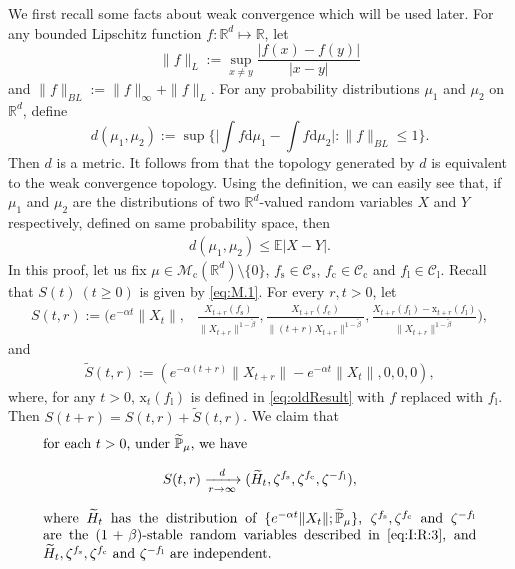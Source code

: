 \documentclass{amse-new}
\numberwithin{equation}{section}
\begin{document}
\begin{prof}
 	We first recall some facts about weak convergence which will be used later.
	For any bounded Lipschitz function $f:\mathbb R^d\mapsto \mathbb R$, let
\[
	\|f\|_L
	:=\sup_{x\neq y}\frac{|f(x)-f(y)|}{|x-y|}
\]
	and $\|f\|_{BL}:= \|f\|_{\infty}+\|f\|_L.$
	For any probability distributions $\mu_1$ and $\mu_2$ on $\mathbb R^d$, define
\[
	d(\mu_1,\mu_2)
  	:=\sup\Big\{\Big|\int f \mathrm d\mu_1-\int f \mathrm d\mu_2\Big|:\|f\|_{BL}\leq 1\Big\}.
\]
	Then $d$ is a metric. It follows from \cite[Theorem 11.3.3]{Dudley2002} that the topology generated by $d$ is equivalent to the weak convergence topology.
	Using the definition, we can easily see that, if $\mu_1$ and $\mu_2$ are the distributions of two $\mathbb R^d $-valued random variables $X$ and $Y$ respectively, defined on same probability space, then
\begin{align}
\label{ineq: distribution control}
  	d(\mu_1,\mu_2)
  	\leq \mathbb E|X-Y|.
\end{align}
	In this proof, let us fix $\mu\in \mathcal M_\mathrm c(\mathbb R^d)\setminus \{0\}$, $f_\mathrm s\in \mathcal C_\mathrm s$, $f_\mathrm c \in \mathcal C_\mathrm c$ and $f_\mathrm l \in \mathcal C_\mathrm l$.
	Recall that $S(t)~(t\geq 0)$ is given by \eqref{eq:M.1}.
	For every $r,t> 0$, let
\begin{align}
	S(t,r)
	:=\Big(e^{-\alpha t}\|X_t\|,& \frac{X_{t+r}(f_\mathrm s)}{\|X_{t+r}\|^{1-\tilde{\beta}}}, \frac{X_{t+r}(f_\mathrm c)}{\|(t+r)X_{t+r}\|^{1-\tilde{\beta}}}, \frac{X_{t+r}(f_\mathrm l)-\mathrm x_{t+r}(f_\mathrm l) }{\|X_{t+r}\|^{1-\tilde{\beta}}}\Big),
\end{align}
	and
\begin{align}
	\widetilde{S}(t,r)
	:=
	(e^{-\alpha (t+r)}\|X_{t+r}\|-e^{-\alpha t}\|X_t\|,0,0,0),
\end{align}
	where, for any $t>0$, $\mathrm x_t(f_\mathrm l)$ is defined in \eqref{eq:oldResult} with $f$ replaced with $f_\mathrm l$.
	Then $S(t+r)=S(t,r)+\widetilde{S}(t,r)$.
	We claim that
\begin{equation}
\label{eq:M.3}
\begin{minipage}{0.9\textwidth}
	for each $t> 0$, under $\widetilde{\mathbb P}_{\mu}$, we have
\[
	S(t,r)
	\xrightarrow[r\rightarrow \infty]{d} (\widetilde H_t,\zeta^{f_\mathrm s},\zeta^{f_\mathrm c},\zeta^{-f_\mathrm l}),
\]
	where $\widetilde H_t$ has the distribution of $\{e^{-\alpha t} \|X_t\|; \widetilde {\mathbb P}_\mu\}$, $\zeta^{f_\mathrm s},\zeta^{f_\mathrm c}$ and $\zeta^{-f_\mathrm l}$ are the $(1+\beta)$-stable random variables described in \eqref{eq:I:R:3}, 	and $\widetilde H_t,\zeta^{f_\mathrm s},\zeta^{f_\mathrm c}$ and $\zeta^{-f_\mathrm l}$ are independent.
\end{minipage}
\end{equation}


\end{prof}
\end{document}
